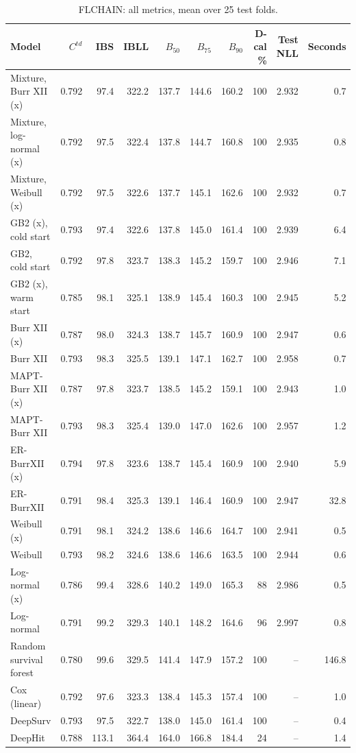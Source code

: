 \begin{table}[htbp]
\centering
\caption{FLCHAIN: all metrics, mean over 25 test folds.}\label{stab:real_flchain}
\footnotesize
\begin{tabular}{lrrrrrrrrr}
\toprule
Model & $C^{td}$ & IBS & IBLL & $B_{50}$ & $B_{75}$ & $B_{90}$ & D-cal \% & Test NLL & Seconds \\
\midrule
Mixture, Burr XII (x) & 0.792 & 97.4 & 322.2 & 137.7 & 144.6 & 160.2 & 100 & 2.932 & 0.7 \\
Mixture, log-normal (x) & 0.792 & 97.5 & 322.4 & 137.8 & 144.7 & 160.8 & 100 & 2.935 & 0.8 \\
Mixture, Weibull (x) & 0.792 & 97.5 & 322.6 & 137.7 & 145.1 & 162.6 & 100 & 2.932 & 0.7 \\
GB2 (x), cold start & 0.793 & 97.4 & 322.6 & 137.8 & 145.0 & 161.4 & 100 & 2.939 & 6.4 \\
GB2, cold start & 0.792 & 97.8 & 323.7 & 138.3 & 145.2 & 159.7 & 100 & 2.946 & 7.1 \\
GB2 (x), warm start & 0.785 & 98.1 & 325.1 & 138.9 & 145.4 & 160.3 & 100 & 2.945 & 5.2 \\
Burr XII (x) & 0.787 & 98.0 & 324.3 & 138.7 & 145.7 & 160.9 & 100 & 2.947 & 0.6 \\
Burr XII & 0.793 & 98.3 & 325.5 & 139.1 & 147.1 & 162.7 & 100 & 2.958 & 0.7 \\
MAPT-Burr XII (x) & 0.787 & 97.8 & 323.7 & 138.5 & 145.2 & 159.1 & 100 & 2.943 & 1.0 \\
MAPT-Burr XII & 0.793 & 98.3 & 325.4 & 139.0 & 147.0 & 162.6 & 100 & 2.957 & 1.2 \\
ER-BurrXII (x) & 0.794 & 97.8 & 323.6 & 138.7 & 145.4 & 160.9 & 100 & 2.940 & 5.9 \\
ER-BurrXII & 0.791 & 98.4 & 325.3 & 139.1 & 146.4 & 160.9 & 100 & 2.947 & 32.8 \\
Weibull (x) & 0.791 & 98.1 & 324.2 & 138.6 & 146.6 & 164.7 & 100 & 2.941 & 0.5 \\
Weibull & 0.793 & 98.2 & 324.6 & 138.6 & 146.6 & 163.5 & 100 & 2.944 & 0.6 \\
Log-normal (x) & 0.786 & 99.4 & 328.6 & 140.2 & 149.0 & 165.3 & 88 & 2.986 & 0.5 \\
Log-normal & 0.791 & 99.2 & 329.3 & 140.1 & 148.2 & 164.6 & 96 & 2.997 & 0.8 \\
Random survival forest & 0.780 & 99.6 & 329.5 & 141.4 & 147.9 & 157.2 & 100 & -- & 146.8 \\
Cox (linear) & 0.792 & 97.6 & 323.3 & 138.4 & 145.3 & 157.4 & 100 & -- & 1.0 \\
DeepSurv & 0.793 & 97.5 & 322.7 & 138.0 & 145.0 & 161.4 & 100 & -- & 0.4 \\
DeepHit & 0.788 & 113.1 & 364.4 & 164.0 & 166.8 & 184.4 & 24 & -- & 1.4 \\
\bottomrule
\end{tabular}


\end{table}
